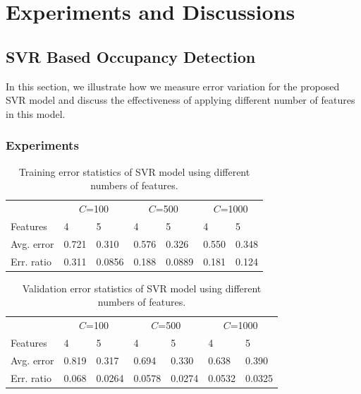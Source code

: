 \section{Experiments and Discussions}
\subsection{SVR Based Occupancy Detection}
In this section, we illustrate how we measure error variation for
the proposed SVR model and discuss the effectiveness of applying
different number of features in this model.

\subsubsection{Experiments}
\begin{table}[!h]
\label{table:training}
\caption{Training error statistics of SVR model using different numbers of features.}
\centering
\begin{tabular}{m{1.2cm}m{0.8cm}m{0.8cm}m{0.8cm}m{0.8cm}m{0.8cm}m{0.8cm}}
\hline
& \multicolumn{2}{c}{$C$=100} & \multicolumn{2}{c}{$C$=500} & \multicolumn{2}{c}{$C$=1000} \\
\cline{2-7}
Features &   \hspace{0.2cm} 4  &\hspace{0.2cm}   5  &\hspace{0.2cm}   4  &\hspace{0.2cm}   5  &\hspace{0.2cm}   4  & \hspace{0.2cm}  5  \\
\hline
Avg. error&0.721& 0.310   & 0.576 &  0.326   &  0.550  &  0.348        \\
Err. ratio&0.311& 0.0856  & 0.188 &  0.0889  &  0.181  &  0.124        \\
\hline
\end{tabular}
\end{table}


\begin{table}[!h]
\label{table:testing}
\caption{Validation error statistics of SVR model using different numbers of features.}
\centering
\begin{tabular}{m{1.2cm}m{0.8cm}m{0.8cm}m{0.8cm}m{0.8cm}m{0.8cm}m{0.8cm}}
\hline
& \multicolumn{2}{c}{$C$=100} & \multicolumn{2}{c}{$C$=500} & \multicolumn{2}{c}{$C$=1000} \\
\cline{2-7}
Features &   \hspace{0.2cm} 4  &\hspace{0.2cm}   5  &\hspace{0.2cm}   4  &\hspace{0.2cm}   5  &\hspace{0.2cm}   4  & \hspace{0.2cm}  5  \\
\hline
Avg. error&0.819& 0.317   & 0.694 &  0.330   &  0.638  &  0.390        \\
Err. ratio&0.068& 0.0264  & 0.0578 &  0.0274  &  0.0532  &  0.0325        \\
\hline
\end{tabular}
\end{table}

